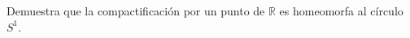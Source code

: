 
\item Demuestra que la compactificación por un punto de $\mathbb{R}$ es homeomorfa al círculo $S^1$.



